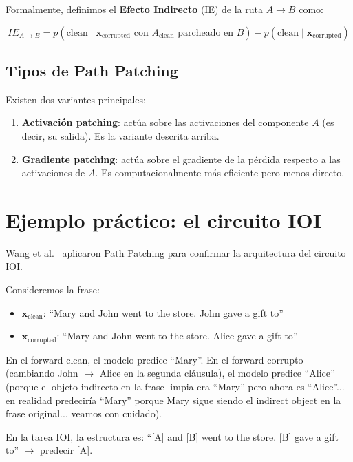 \documentclass[11pt,a4paper]{report}
\theoremstyle{definition}
\begin{document}
Formalmente, definimos el \textbf{Efecto Indirecto} (IE) de la ruta $A \to B$ como:

\[
IE_{A \to B} = p(\text{clean} \mid \mathbf{x}_{\text{corrupted}} \text{ con } A_{\text{clean}} \text{ parcheado en } B) - p(\text{clean} \mid \mathbf{x}_{\text{corrupted}})
\]

\subsection{Tipos de Path Patching}

Existen dos variantes principales:

\begin{enumerate}
    \item \textbf{Activación patching}: actúa sobre las activaciones del componente $A$ (es decir, su salida). Es la variante descrita arriba.
    \item \textbf{Gradiente patching}: actúa sobre el gradiente de la pérdida respecto a las activaciones de $A$. Es computacionalmente más eficiente pero menos directo.
\end{enumerate}

\section{Ejemplo práctico: el circuito IOI}

Wang et al.~\cite{wang2022ioi} aplicaron Path Patching para confirmar la arquitectura del circuito IOI.

Consideremos la frase:
\begin{itemize}
    \item $\mathbf{x}_{\text{clean}}$: ``Mary and John went to the store. John gave a gift to''
    \item $\mathbf{x}_{\text{corrupted}}$: ``Mary and John went to the store. Alice gave a gift to''
\end{itemize}

En el forward clean, el modelo predice ``Mary''. En el forward corrupto (cambiando John $\to$ Alice en la segunda cláusula), el modelo predice ``Alice'' (porque el objeto indirecto en la frase limpia era ``Mary'' pero ahora es ``Alice''... en realidad predeciría ``Mary'' porque Mary sigue siendo el indirect object en la frase original... veamos con cuidado).

En la tarea IOI, la estructura es: ``[A] and [B] went to the store. [B] gave a gift to'' $\rightarrow$ predecir [A].
\end{document}
